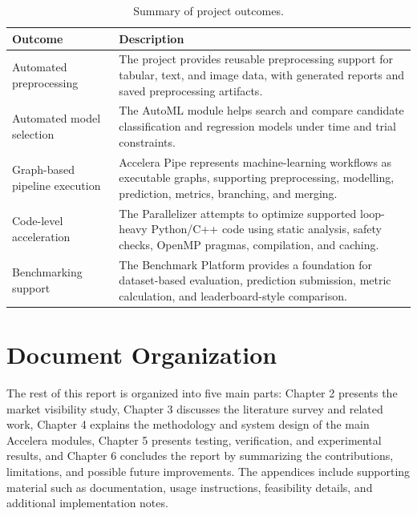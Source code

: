 \documentclass[12pt,a4paper]{report}
\newcommand{\acceleraTableStyle}{%
\small
\renewcommand{\arraystretch}{1.15}
\setlength{\tabcolsep}{4pt}%
}
\begin{document}
\begin{table}[!htbp]
\centering
\acceleraTableStyle
\caption{Summary of project outcomes.}
\label{tab:intro-outcomes}
\begin{tabular}{p{}p{}}
\toprule
\textbf{Outcome} & \textbf{Description} \\
\midrule

Automated preprocessing &
The project provides reusable preprocessing support for tabular, text, and image
data, with generated reports and saved preprocessing artifacts. \\
\midrule

Automated model selection &
The AutoML module helps search and compare candidate classification and
regression models under time and trial constraints. \\
\midrule

Graph-based pipeline execution &
Accelera Pipe represents machine-learning workflows as executable graphs,
supporting preprocessing, modelling, prediction, metrics, branching, and merging. \\
\midrule

Code-level acceleration &
The Parallelizer attempts to optimize supported loop-heavy Python/C++ code using
static analysis, safety checks, OpenMP pragmas, compilation, and caching. \\
\midrule

Benchmarking support &
The Benchmark Platform provides a foundation for dataset-based evaluation,
prediction submission, metric calculation, and leaderboard-style comparison. \\

\bottomrule
\end{tabular}
\end{table}

\section{Document Organization}

The rest of this report is organized into five main parts: Chapter 2 presents the market visibility study, 
Chapter 3 discusses the literature survey and related work, Chapter 4 explains the methodology and system 
design of the main Accelera modules, Chapter 5 presents testing, verification, and experimental results, 
and Chapter 6 concludes the report by summarizing the contributions, limitations, and possible future improvements. 
The appendices include supporting material such as documentation, usage instructions, feasibility details, 
and additional implementation notes.
\end{document}
